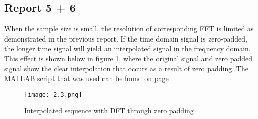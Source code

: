 	\subsection*{Report 5 + 6}
	When the sample size is small, the resolution of corresponding FFT is limited as demonstrated in the previous report. If the time domain signal is zero-padded, the longer time signal will yield an interpolated signal in the frequency domain. This effect is shown below in figure \ref{figure:2_3}, where the original signal and zero padded signal show the clear interpolation that occurs as a result of zero padding. The MATLAB script that was used can be found on page \pageref{matlab_2.3}.
	
	\begin{figure}[H] 
		\centering
		\texttt{[image: 2.3.png]}
		\caption{Interpolated sequence with DFT through zero padding}
		\label{figure:2_3}
	\end{figure}